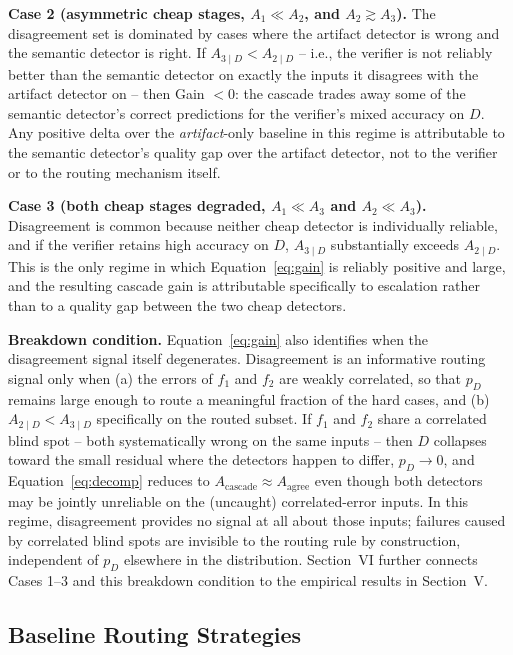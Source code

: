 \documentclass{ieeeaccess}
\begin{document}
\textbf{Case 2 (asymmetric cheap stages, $A_1 \ll A_2$, and $A_2 \gtrsim A_3$).}
The disagreement set is dominated by cases where the artifact detector is
wrong and the semantic detector is right. If $A_{3\mid D} < A_{2\mid D}$ --
i.e., the verifier is not reliably better than the semantic detector on
exactly the inputs it disagrees with the artifact detector on -- then
Gain $< 0$: the cascade trades away some of the semantic detector's correct
predictions for the verifier's mixed accuracy on $D$. Any positive delta
over the \emph{artifact}-only baseline in this regime is attributable to the
semantic detector's quality gap over the artifact detector, not to the
verifier or to the routing mechanism itself.

\textbf{Case 3 (both cheap stages degraded, $A_1 \ll A_3$ and $A_2 \ll A_3$).}
Disagreement is common because neither cheap detector is individually
reliable, and if the verifier retains high accuracy on $D$, $A_{3\mid D}$
substantially exceeds $A_{2\mid D}$. This is the only regime in which
Equation~\eqref{eq:gain} is reliably positive and large, and the resulting
cascade gain is attributable specifically to escalation rather than to a
quality gap between the two cheap detectors.

\textbf{Breakdown condition.} Equation~\eqref{eq:gain} also identifies when
the disagreement signal itself degenerates. Disagreement is an informative
routing signal only when (a) the errors of $f_1$ and $f_2$ are weakly
correlated, so that $p_D$ remains large enough to route a meaningful
fraction of the hard cases, and (b) $A_{2\mid D} < A_{3\mid D}$ specifically
on the routed subset. If $f_1$ and $f_2$ share a correlated blind spot --
both systematically wrong on the same inputs -- then $D$ collapses toward
the small residual where the detectors happen to differ, $p_D \to 0$, and
Equation~\eqref{eq:decomp} reduces to $A_{\text{cascade}} \approx A_{\text{agree}}$
even though both detectors may be jointly unreliable on the (uncaught)
correlated-error inputs. In this regime, disagreement provides no signal at
all about those inputs; failures caused by correlated blind spots are
invisible to the routing rule by construction, independent of $p_D$
elsewhere in the distribution. Section~VI further connects Cases 1--3 and
this breakdown condition to the empirical results in Section~V.

\subsection{Baseline Routing Strategies}
\end{document}
